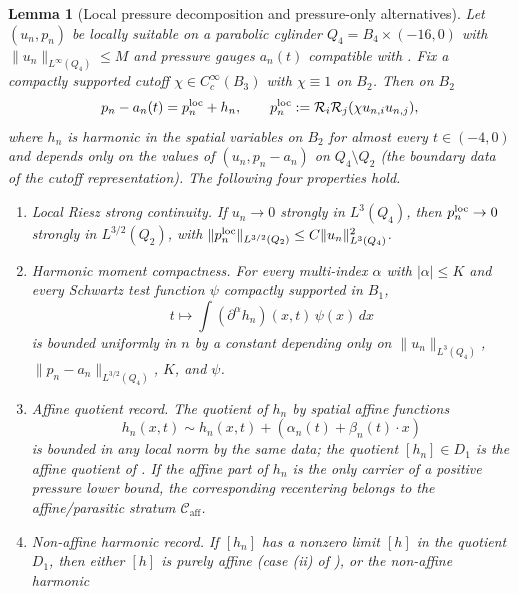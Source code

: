 \documentclass[11pt]{amsart}
\numberwithin{equation}{section}
\theoremstyle{plain}
\newtheorem{lemma}[lemma]{Lemma}
\theoremstyle{definition}
\theoremstyle{remark}
\newcommand{\Caff}{\mathcal C_{\mathrm{aff}}}
\begin{document}
\begin{lemma}[Local pressure decomposition and pressure-only alternatives]
\label{lem:local-pressure-decomposition}
Let \((u_n,p_n)\) be locally suitable on a parabolic cylinder
\(Q_4=B_4\times(-16,0)\) with \(\|u_n\|_{L^\infty(Q_4)}\le M\) and pressure
gauges \(a_n(t)\) compatible with .
Fix a compactly supported cutoff \(\chi\in C_c^\infty(B_3)\) with
\(\chi\equiv1\) on \(B_2\).  Then on \(B_2\)
\begin{equation}\label{eq:local-pressure-split}
   p_n-a_n(t)=p_n^{\rm loc}+h_n,
   \qquad
   p_n^{\rm loc}:=\mathcal R_i\mathcal R_j(\chi u_{n,i}u_{n,j}),
\end{equation}
where \(h_n\) is harmonic in the spatial variables on \(B_2\) for almost
every \(t\in(-4,0)\) and depends only on the values of
\((u_n,p_n-a_n)\) on \(Q_4\setminus Q_2\) (the boundary data of the cutoff
representation).  The following four properties hold.
\begin{enumerate}[label=\textup{(\roman*)}]
   \item \emph{Local Riesz strong continuity.} If
   \(u_n\to0\) strongly in \(L^3(Q_4)\), then
   \(p_n^{\rm loc}\to0\) strongly in \(L^{3/2}(Q_2)\), with
   \(\|p_n^{\rm loc}\|_{L^{3/2}(Q_2)}\le C\|u_n\|_{L^3(Q_4)}^2\).
   \item \emph{Harmonic moment compactness.} For every multi-index
   \(\alpha\) with \(|\alpha|\le K\) and every Schwartz test function
   \(\psi\) compactly supported in \(B_1\),
   \[
      t\mapsto \int (\partial^\alpha h_n)(x,t)\,\psi(x)\,dx
   \]
   is bounded uniformly in \(n\) by a constant depending only on
   \(\|u_n\|_{L^3(Q_4)}\), \(\|p_n-a_n\|_{L^{3/2}(Q_4)}\), \(K\), and
   \(\psi\).
   \item \emph{Affine quotient record.} The quotient of \(h_n\) by spatial
   affine functions
   \[
      h_n(x,t)\sim h_n(x,t)+(\alpha_n(t)+\beta_n(t)\cdot x)
   \]
   is bounded in any local norm by the same data; the
   quotient \([h_n]\in D_1\) is the affine quotient of
   .  If the affine part of \(h_n\)
   is the only carrier of a positive pressure lower bound, the corresponding
   recentering belongs to the affine/parasitic stratum \(\Caff\).
   \item \emph{Non-affine harmonic record.} If \([h_n]\) has a nonzero
   limit \([h]\) in the quotient \(D_1\), then either
   \([h]\) is purely affine (case \textup{(ii)} of
   ), or the non-affine harmonic

\end{enumerate}
\end{lemma}
\end{document}
